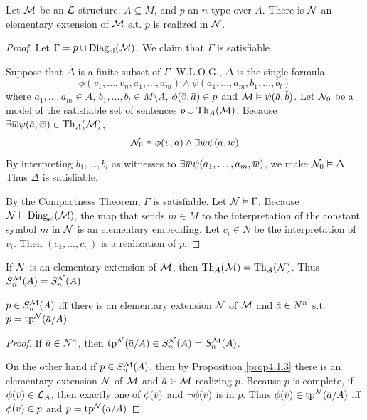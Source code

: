 \documentclass[11pt]{article}
\begin{document}
\begin{proposition}[]
\label{prop4.1.3}
Let \(\mathcal{M}\) be an \(\mathcal{L}\)-structure, \(A\subseteq M\), and \(p\) an \(n\)-type over \(A\). There is \(\mathcal{N}\) an
elementary extension of \(\mathcal{M}\) s.t. \(p\) is realized in \(\mathcal{N}\).
\end{proposition}

\begin{proof}
Let \(\Gamma=p\cup\operatorname{Diag}_{\operatorname{el}}(\mathcal{M})\). We claim that \(\Gamma\) is satisfiable

Suppose that \(\Delta\) is a finite subset of \(\Gamma\). W.L.O.G., \(\Delta\) is the single formula
\begin{equation*}
\phi(v_1,\dots,v_n,a_1,\dots,a_m)\wedge\psi(a_1,\dots,a_m,b_1,\dots,b_l)
\end{equation*}
where \(a_1,\dots,a_m\in A\), \(b_1,\dots,b_l\in M\setminus A\), \(\phi(\barv,\bara)\in p\) and \(\calm\vDash\psi(\bara,\barb)\).
Let \(\mathcal{N}_0\) be a model of the satisfiable set of sentences \(p\cup\operatorname{Th}_A(\mathcal{M})\).
Because \(\exists\barw\psi(\bara,\barw)\in\Th_A(\calm)\),
\begin{equation*}
\caln_0\vDash\phi(\barv,\bara)\wedge\exists\barw\psi(\bara,\barw)
\end{equation*}
By interpreting \(b_1,\dots,b_l\) as witnesses to \(\exists\barw\psi(a_1,\dots,a_m,\barw)\), we make \(\mathcal{N}_0\vDash\Delta\).
Thus \(\Delta\) is satisfiable.

By the Compactness Theorem, \(\Gamma\) is satisfiable. Let \(\mathcal{N}\vDash\Gamma\). Because \(\mathcal{N}\vDash\operatorname{Diag}_{\operatorname{el}}(\mathcal{M})\), the map
that sends \(m\in M\) to the interpretation of the constant symbol \(m\) in \(\mathcal{N}\) is an elementary
embedding. Let \(c_i\in N\) be the interpretation of \(v_i\). Then \((c_1,\dots,c_n)\) is a realization
of \(p\).
\end{proof}

If \(\mathcal{N}\) is an elementary extension of \(\mathcal{M}\), then \(\operatorname{Th}_A(\mathcal{M})=\operatorname{Th}_A(\mathcal{N})\). Thus \(S_n^{\mathcal{M}}(A)=S_n^{\mathcal{N}}(A)\)

\begin{corollary}[]
\(p\in S_n^{\mathcal{M}}(A)\) iff there is an elementary extension \(\mathcal{N}\) of \(\mathcal{M}\) and \(\bara\in N^n\) s.t. \(p=\tp^{\caln}(\bara/A)\)
\end{corollary}

\begin{proof}
If \(\bara\in N^n\), then \(\tp^{\caln}(\bara/A)\in S_n^{\caln}(A)=S_n^{\calm}(A)\).

On the other hand if \(p\in S_n^{\mathcal{M}}(A)\), then by Proposition \ref{prop4.1.3} there is an elementary
extension \(\mathcal{N}\) of \(\mathcal{M}\) and \(\bara\in\calm\) realizing \(p\). Because \(p\) is complete,
if \(\phi(\barv)\in\call_A\), then exactly one of \(\phi(\barv)\) and \(\neg\phi(\barv)\) is in \(p\).
Thus \(\phi(\barv)\in\tp^{\caln}(\bara/A)\) iff \(\phi(\barv)\in p\) and \(p=\tp^{\caln}(\bara/A)\)
\end{proof}
\end{document}
